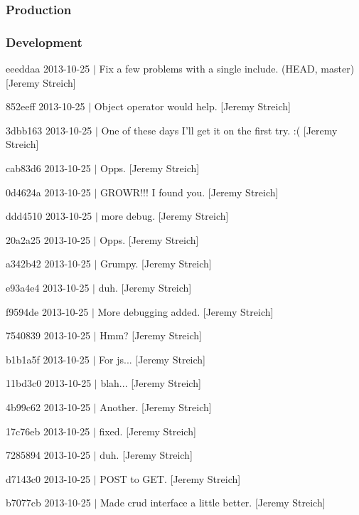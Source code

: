\subsubsection*{Production}

\subsubsection*{Development}


\begin{DoxyItemize}
\item eeeddaa 2013-\/10-\/25 $|$ Fix a few problems with a single include. (H\-E\-A\-D, master) \mbox{[}Jeremy Streich\mbox{]}
\item 852eeff 2013-\/10-\/25 $|$ Object operator would help. \mbox{[}Jeremy Streich\mbox{]}
\item 3dbb163 2013-\/10-\/25 $|$ One of these days I'll get it on the first try. \-:( \mbox{[}Jeremy Streich\mbox{]}
\item cab83d6 2013-\/10-\/25 $|$ Opps. \mbox{[}Jeremy Streich\mbox{]}
\item 0d4624a 2013-\/10-\/25 $|$ G\-R\-O\-W\-R!!! I found you. \mbox{[}Jeremy Streich\mbox{]}
\item ddd4510 2013-\/10-\/25 $|$ more debug. \mbox{[}Jeremy Streich\mbox{]}
\item 20a2a25 2013-\/10-\/25 $|$ Opps. \mbox{[}Jeremy Streich\mbox{]}
\item a342b42 2013-\/10-\/25 $|$ Grumpy. \mbox{[}Jeremy Streich\mbox{]}
\item e93a4e4 2013-\/10-\/25 $|$ duh. \mbox{[}Jeremy Streich\mbox{]}
\item f9594de 2013-\/10-\/25 $|$ More debugging added. \mbox{[}Jeremy Streich\mbox{]}
\item 7540839 2013-\/10-\/25 $|$ Hmm? \mbox{[}Jeremy Streich\mbox{]}
\item b1b1a5f 2013-\/10-\/25 $|$ For js... \mbox{[}Jeremy Streich\mbox{]}
\item 11bd3c0 2013-\/10-\/25 $|$ blah... \mbox{[}Jeremy Streich\mbox{]}
\item 4b99c62 2013-\/10-\/25 $|$ Another. \mbox{[}Jeremy Streich\mbox{]}
\item 17c76eb 2013-\/10-\/25 $|$ fixed. \mbox{[}Jeremy Streich\mbox{]}
\item 7285894 2013-\/10-\/25 $|$ duh. \mbox{[}Jeremy Streich\mbox{]}
\item d7143c0 2013-\/10-\/25 $|$ P\-O\-S\-T to G\-E\-T. \mbox{[}Jeremy Streich\mbox{]}
\item b7077cb 2013-\/10-\/25 $|$ Made crud interface a little better. \mbox{[}Jeremy Streich\mbox{]}

\end{DoxyItemize}
